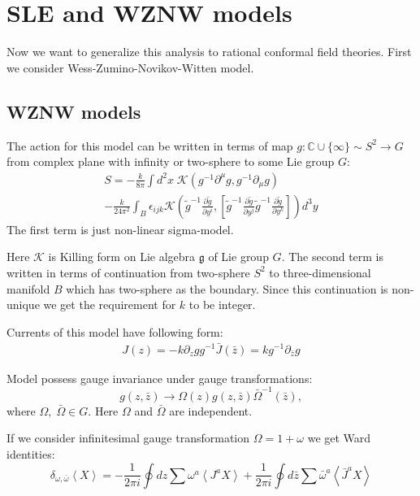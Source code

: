 \documentclass[12pt]{article}
\theoremstyle{definition}
\newcommand{\gf}{\mathfrak{g}}
\theoremstyle{definition} \newtheorem{Def}{Definition}
\begin{document}
\section{SLE and WZNW models}
\label{sec:sle-wzw-models}
Now we want to generalize this analysis to rational conformal field theories. First we consider Wess-Zumino-Novikov-Witten model.
\subsection{WZNW models}

 The action for this model can be written in terms of map $g:\mathbb{C}\cup \{\infty\}\sim S^{2}\to G$ from complex plane with infinity or two-sphere to some Lie group $G$:
\begin{multline}
  S=-\frac{k}{8\pi}\int d^2x\; \mathcal{K} (g^{-1}\partial^{\mu}g, g^{-1} \partial_{\mu}g)  
  \\
  - \frac{k }{24\pi^{2}} \int_{B}\epsilon_{ijk} \mathcal{K}\left(
    \tilde g^{-1}\frac{\partial \tilde g}{\partial y^i},\left[
      \tilde g^{-1}\frac{\partial \tilde g}{\partial y^j}
      \tilde g^{-1}\frac{\partial \tilde g}{\partial y^k}\right]\right) d^3y
\end{multline}
The first term is just non-linear sigma-model.

 Here $\mathcal{K}$ is Killing form on Lie algebra $\gf$ of Lie group $G$. The second term is written in terms of continuation from two-sphere $S^{2}$ to three-dimensional manifold $B$ which has two-sphere as the boundary. Since this continuation is non-unique we get the requirement for $k$ to be integer. 

Currents of this model have following form:
  \begin{eqnarray}
    J(z)= -k \partial_zg g^{-1}
    \bar J(\bar z)=k g^{-1}\partial_{\bar z}g
  \end{eqnarray}

Model possess gauge invariance under gauge transformations:
  \begin{equation*}
    g(z,\bar z)\to \Omega(z)g(z,\bar z)\bar \Omega^{-1}(\bar z),
  \end{equation*}
  where $\Omega,\;\bar \Omega \in G$.
Here $\Omega$ and $\bar \Omega$ are independent. 

If we consider infinitesimal gauge transformation $\Omega=1+\omega$ we get Ward identities:
  \begin{equation}
    \label{eq:87}
    \delta_{\omega,\bar \omega}\left< X \right>=-\frac{1}{2\pi i}\oint dz \sum\omega^a \left< J^a X\right>+
    \frac{1}{2\pi i} \oint d\bar z \sum \bar \omega^a \left< \bar J^a X\right>
  \end{equation}
\end{document}
